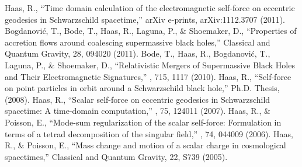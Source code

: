  Haas, R., ``Time domain calculation of the electromagnetic self-force on eccentric geodesics in Schwarzschild spacetime,'' arXiv e-prints, arXiv:1112.3707 (2011).
 Bogdanovi{\'c}, T., Bode, T., Haas, R., Laguna, P., \& Shoemaker, D., ``Properties of accretion flows around coalescing supermassive black holes,'' Classical and Quantum Gravity, 28, 094020 (2011).
 Bode, T., Haas, R., Bogdanovi{\'c}, T., Laguna, P., \& Shoemaker, D., ``Relativistic Mergers of Supermassive Black Holes and Their Electromagnetic Signatures,'' \apj, 715, 1117 (2010).
 Haas, R., ``Self-force on point particles in orbit around a Schwarzschild black hole,'' Ph.D. Thesis, (2008).
 Haas, R., ``Scalar self-force on eccentric geodesics in Schwarzschild spacetime: A time-domain computation,'' \prd, 75, 124011 (2007).
 Haas, R., \& Poisson, E., ``Mode-sum regularization of the scalar self-force: Formulation in terms of a tetrad decomposition of the singular field,'' \prd, 74, 044009 (2006).
 Haas, R., \& Poisson, E., ``Mass change and motion of a scalar charge in cosmological spacetimes,'' Classical and Quantum Gravity, 22, S739 (2005).

